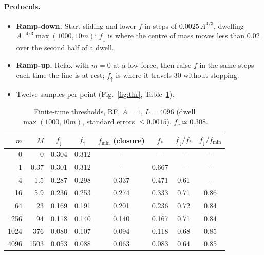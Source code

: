 \documentclass[10pt,a4paper]{article}
\newcommand{\fd}{f_\downarrow}
\newcommand{\fu}{f_\uparrow}
\newcommand{\fcs}{f_c}
\begin{document}
\paragraph{Protocols.}
\begin{itemize}
\item \textbf{Ramp-down.} Start sliding and lower $f$ in steps of $0.0025\,A^{4/3}$, dwelling $A^{-4/3}\max(1000,10m)$; $\fd$ is where the centre of mass moves less than $0.02$ over the second half of a dwell.
\item \textbf{Ramp-up.} Relax with $m=0$ at a low force, then raise $f$ in the same steps each time the line is at rest; $\fu$ is where it travels 30 without stopping.
\item Twelve samples per point (Fig.~\ref{fig:thr}, Table~\ref{tab:thr}).
\end{itemize}

\begin{table}[H]
\centering\small
\begin{tabular}{rrcccccc}
\toprule
$m$ & $M$ & $\fd$ & $\fu$ & $f_{\min}$ (closure) & $f_*$ & $\fd/f_*$ & $\fd/f_{\min}$\\
\midrule
0 & 0 & 0.304 & 0.312 & -- & -- & -- & -- \\
1 & 0.37 & 0.301 & 0.312 & -- & 0.667 & -- & -- \\
4 & 1.5 & 0.287 & 0.298 & 0.337 & 0.471 & 0.61 & -- \\
16 & 5.9 & 0.236 & 0.253 & 0.274 & 0.333 & 0.71 & 0.86 \\
64 & 23 & 0.169 & 0.191 & 0.201 & 0.236 & 0.72 & 0.84 \\
256 & 94 & 0.118 & 0.140 & 0.140 & 0.167 & 0.71 & 0.84 \\
1024 & 376 & 0.080 & 0.107 & 0.094 & 0.118 & 0.68 & 0.85 \\
4096 & 1503 & 0.053 & 0.088 & 0.063 & 0.083 & 0.64 & 0.85 \\
\bottomrule
\end{tabular}
\caption{Finite-time thresholds, RF, $A=1$, $L=4096$ (dwell $\max(1000,10m)$, standard errors $\le0.0015$). $\fcs\simeq0.308$.}
\label{tab:thr}
\end{table}
\end{document}
